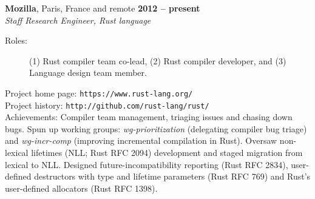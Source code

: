 \documentclass[margin,line,draft]{res}
\begin{document}
\begin{resume}
    \textbf{Mozilla}, Paris, France and remote \hfill \textbf{2012 -- present}\\\vspace{1mm}%
    \textsl{Staff Research Engineer, Rust language}
\begin{description}
\item[\rm Roles:]
  (1) Rust compiler team co-lead, (2) Rust compiler developer, and (3) Language design team member.
\end{description}
    \vspace{-2mm}
    Project home page: {\tt https://www.rust-lang.org/} \\
    Project history: {\tt http://github.com/rust-lang/rust/} \\
    Achievements: Compiler team management, triaging issues and chasing down bugs. Spun up working groups: \emph{wg-prioritization} (delegating compiler bug triage) and \emph{wg-incr-comp} (improving incremental compilation in Rust). Oversaw non-lexical lifetimes (NLL; Rust RFC 2094) development and staged migration from lexical to NLL. Designed future-incompatibility reporting (Rust RFC 2834), user-defined destructors with type and lifetime parameters (Rust RFC 769) and Rust's user-defined allocators (Rust RFC 1398).


\end{resume}
\end{document}

